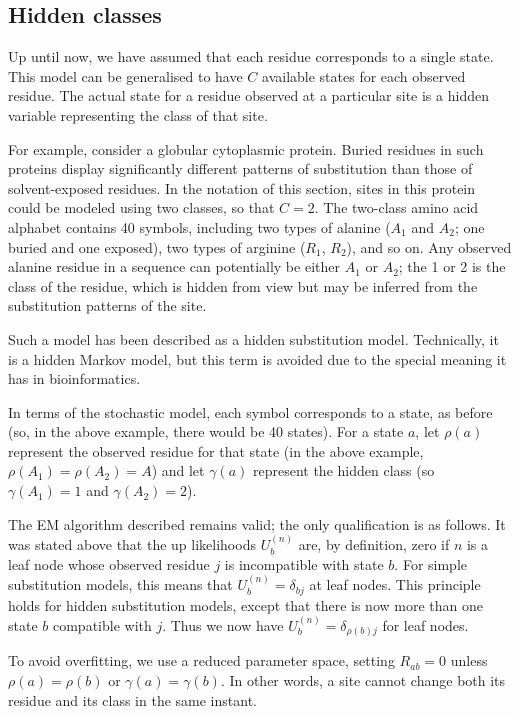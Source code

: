\documentclass[12pt]{article}
\begin{document}
\subsection{Hidden classes}

Up until now, we have assumed that each residue corresponds to a single state. This model can be
generalised to have $C$ available states for each observed residue. The actual state for a residue
observed at a particular site is a hidden variable representing the class of that site.

For example, consider a globular cytoplasmic protein. Buried residues in such proteins display
significantly different patterns of substitution than those of solvent-exposed
residues.\cite{Branden1991} In the notation of this section, sites in this protein could be modeled
using two classes, so that $C = 2$. The two-class amino acid alphabet contains 40 symbols, including
two types of alanine ($A_1$ and $A_2$; one buried and one exposed), two types of arginine ($R_1$,
$R_2$), and so on. Any observed alanine residue in a sequence can potentially be either $A_1$ or
$A_2$; the 1 or 2 is the class of the residue, which is hidden from view but may be inferred from
the substitution patterns of the site.

Such a model has been described as a hidden substitution model.\cite{Dimmic2000,Koshi2001}
Technically, it is a hidden Markov model, but this term is avoided due to the special meaning it has
in bioinformatics.\cite{Durbin1998}

In terms of the stochastic model, each symbol corresponds to a state, as before (so, in the above
example, there would be 40 states). For a state $a$, let $\rho(a)$ represent the observed residue
for that state (in the above example, $\rho(A_1) = \rho(A_2) = A$) and let $\gamma(a)$ represent
the hidden class (so $\gamma(A_1) = 1$ and $\gamma(A_2) = 2$).

The EM algorithm described remains valid; the only qualification is as follows. It was stated above
that the up likelihoods $U^{(n)}_b$ are, by definition, zero if $n$ is a leaf node whose observed
residue $j$ is incompatible with state $b$. For simple substitution models, this means that
$U^{(n)}_b = \delta_{bj}$ at leaf nodes. This principle holds for hidden substitution models, except
that there is now more than one state $b$ compatible with $j$. Thus we now have
$U^{(n)}_b = \delta_{\rho(b)j}$ for leaf nodes.

To avoid overfitting, we use a reduced parameter space, setting $R_{ab} = 0$ unless $\rho(a) = \rho(b)$
or $\gamma(a) = \gamma(b)$. In other words, a site cannot change both its residue and its class in
the same instant.
\end{document}
